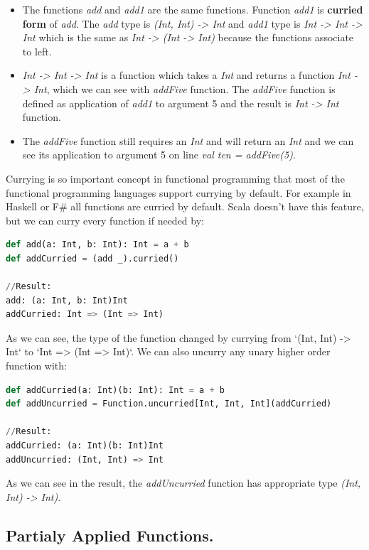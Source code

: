 \documentclass[12pt,twoside,a4paper]{report}
\begin{document}
\begin{itemize}\itemsep1pt \parskip0pt 
\item The functions \emph{add} and \emph{add1} are the same functions. Function \emph{add1} is \textbf{curried form} of \emph{add}. The \emph{add} type is \emph{(Int, Int) -> Int} and \emph{add1} type is \emph{Int -> Int -> Int} which is the same as \emph{Int -> (Int -> Int)} because the functions associate to left.
\item \emph{Int -> Int -> Int} is a function which takes a \emph{Int} and returns a function \emph{Int -> Int}, which we can see with \emph{addFive} function. The \emph{addFive} function is defined as application of \emph{add1} to argument 5 and the result is \emph{Int -> Int} function.
\item The \emph{addFive} function still requires an \emph{Int} and will return an \emph{Int} and we can see its application to argument 5 on line \emph{val ten = addFive(5)}.
\end{itemize}

Currying is so important concept in functional programming that most of the functional programming languages support currying by default. For example in Haskell or F\# all functions are curried by default. Scala doesn't have this feature, but we can curry every function if needed by:
\begin{lstlisting}[language=python]
def add(a: Int, b: Int): Int = a + b
def addCurried = (add _).curried()     

//Result:
add: (a: Int, b: Int)Int
addCurried: Int => (Int => Int)
\end{lstlisting}
As we can see, the type of the function changed by currying from `(Int, Int) -> Int` to `Int => (Int => Int)`. We can also uncurry any unary higher order function with:
\begin{lstlisting}[language=python]
def addCurried(a: Int)(b: Int): Int = a + b
def addUncurried = Function.uncurried[Int, Int, Int](addCurried)

//Result:
addCurried: (a: Int)(b: Int)Int
addUncurried: (Int, Int) => Int
\end{lstlisting}
As we can see in the result, the \emph{addUncurried} function has appropriate type \emph{(Int, Int) -> Int)}.

\subsection{Partialy Applied Functions.}\label{6.6.2}
\end{document}
